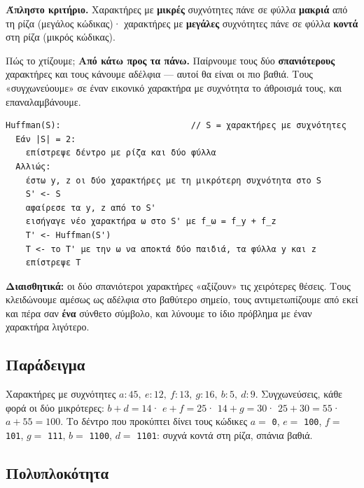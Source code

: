 \documentclass[11pt,a4paper]{article}
\begin{document}
\begin{keypoint}
\textbf{Άπληστο κριτήριο.} Χαρακτήρες με \textbf{μικρές} συχνότητες πάνε σε
φύλλα \textbf{μακριά} από τη ρίζα (μεγάλος κώδικας)· χαρακτήρες με
\textbf{μεγάλες} συχνότητες πάνε σε φύλλα \textbf{κοντά} στη ρίζα (μικρός
κώδικας).
\end{keypoint}

Πώς το χτίζουμε; \textbf{Από κάτω προς τα πάνω.} Παίρνουμε τους δύο
\textbf{σπανιότερους} χαρακτήρες και τους κάνουμε αδέλφια --- αυτοί θα είναι οι
πιο βαθιά. Τους «συγχωνεύουμε» σε έναν εικονικό χαρακτήρα με συχνότητα το
άθροισμά τους, και επαναλαμβάνουμε.

\begin{codebox}
\begin{verbatim}
Huffman(S):                          // S = χαρακτήρες με συχνότητες
  Εάν |S| = 2:
    επίστρεψε δέντρο με ρίζα και δύο φύλλα
  Αλλιώς:
    έστω y, z οι δύο χαρακτήρες με τη μικρότερη συχνότητα στο S
    S' <- S
    αφαίρεσε τα y, z από το S'
    εισήγαγε νέο χαρακτήρα ω στο S' με f_ω = f_y + f_z
    T' <- Huffman(S')
    T <- το T' με την ω να αποκτά δύο παιδιά, τα φύλλα y και z
    επίστρεψε T
\end{verbatim}
\end{codebox}

\begin{intuition}
\textbf{Διαισθητικά:} οι δύο σπανιότεροι χαρακτήρες «αξίζουν» τις χειρότερες
θέσεις. Τους κλειδώνουμε αμέσως ως αδέλφια στο βαθύτερο σημείο, τους
αντιμετωπίζουμε από εκεί και πέρα σαν \textbf{ένα} σύνθετο σύμβολο, και λύνουμε
το ίδιο πρόβλημα με έναν χαρακτήρα λιγότερο.
\end{intuition}

\subsection{Παράδειγμα}

Χαρακτήρες με συχνότητες $a{:}45,\ e{:}12,\ f{:}13,\ g{:}16,\ b{:}5,\ d{:}9$.
Συγχωνεύσεις, κάθε φορά οι δύο μικρότερες: $b + d = 14$· $e + f = 25$·
$14 + g = 30$· $25 + 30 = 55$· $a + 55 = 100$. Το δέντρο που προκύπτει δίνει τους
κώδικες $a = $ \texttt{0}, $e = $ \texttt{100}, $f = $ \texttt{101},
$g = $ \texttt{111}, $b = $ \texttt{1100}, $d = $ \texttt{1101}: συχνά κοντά στη
ρίζα, σπάνια βαθιά.

\subsection{Πολυπλοκότητα}
\end{document}
